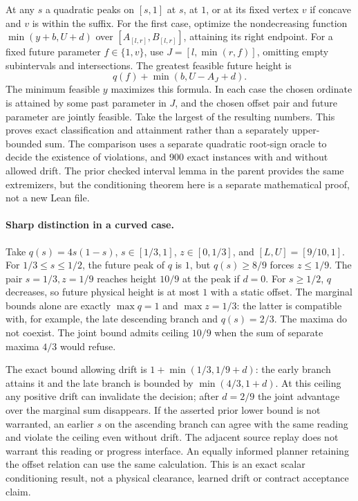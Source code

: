 \documentclass[11pt]{article}
\begin{document}
At any $s$ a quadratic peaks on $[s,1]$ at $s$, at $1$, or at
its fixed vertex $v$ if concave and $v$ is within the suffix.
For the first case, optimize the nondecreasing function
$\min(y+b,U+d)$ over $[A_{[l,r]},B_{[l,r]}]$, attaining its right endpoint.
For a fixed future parameter $f\in\{1,v\}$, use
$J=[l,\min(r,f)]$, omitting empty subintervals and intersections.
The greatest feasible future height is
\[
    q(f)+\min(b,U-A_J+d).
\]
The minimum feasible $y$ maximizes this formula. In each case the
chosen ordinate is attained by some past parameter in $J$, and
the chosen offset pair and future parameter are jointly feasible.
Take the largest of the resulting numbers. This proves exact
classification and attainment rather than a separately upper-bounded
sum. The comparison uses a separate quadratic root-sign oracle to
decide the existence of violations, and 900 exact instances with
and without allowed drift. The prior checked interval lemma in the
parent provides the same extremizers, but the conditioning theorem
here is a separate mathematical proof, not a new Lean file.

\paragraph{Sharp distinction in a curved case.}
Take $q(s)=4s(1-s)$, $s\in[1/3,1]$, $z\in[0,1/3]$, and
$[L,U]=[9/10,1]$. For $1/3\leq s\leq1/2$, the future peak of
$q$ is $1$, but $q(s)\geq8/9$ forces $z\leq1/9$. The pair
$s=1/3,z=1/9$ reaches height $10/9$ at the peak if $d=0$.
For $s\geq1/2$, $q$ decreases, so future physical height is
at most $1$ with a static offset. The marginal bounds alone are
exactly $\max q=1$ and $\max z=1/3$: the latter is compatible with,
for example, the late descending branch and $q(s)=2/3$. The maxima
do not coexist. The joint bound admits ceiling $10/9$ when the
sum of separate maxima $4/3$ would refuse.

The exact bound allowing drift is
$1+\min(1/3,1/9+d)$: the early branch attains it and the late
branch is bounded by $\min(4/3,1+d)$.
At this ceiling any positive drift can invalidate the decision;
after $d=2/9$ the joint advantage over the marginal sum disappears.
If the asserted prior lower bound is not warranted, an earlier
$s$ on the ascending branch can agree with the same reading and
violate the ceiling even without drift. The adjacent source replay
does not warrant this reading or progress interface. An equally
informed planner retaining the offset relation can use the same
calculation. This is an exact scalar conditioning result, not a
physical clearance, learned drift or contract acceptance claim.
\end{document}
